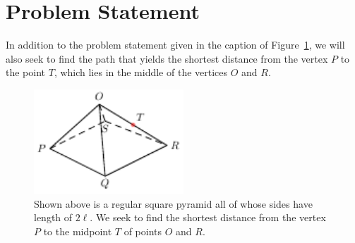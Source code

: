 \section{Problem Statement}
\label{sec:statement}

In addition to the problem statement given in the caption of
Figure~\ref{fig:problem}, we will also seek to find the path that yields the
shortest distance from the vertex $P$ to the point $T$, which lies in the middle
of the vertices $O$ and $R$.

\begin{figure}[h]
  \centering
  \includegraphics[trim={0 0 0 0cm},clip,width=0.5\textwidth]{./figures/pyramid.pdf}
  \vspace{-8mm}
  \caption{Shown above is a regular square pyramid all of whose sides have
  length of $2\ell$. We seek to find the shortest distance from the vertex $P$
  to the midpoint $T$ of points $O$ and $R$.}
  \label{fig:problem}
\end{figure}


